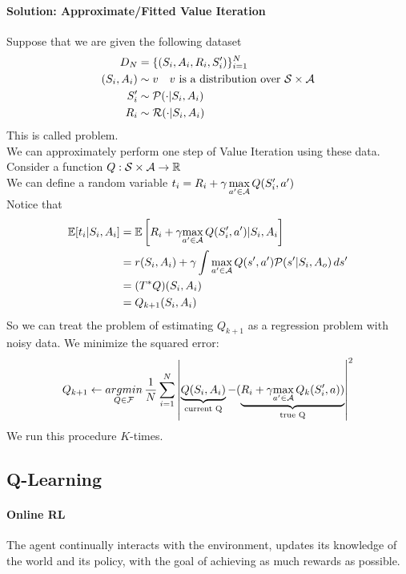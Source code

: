 \documentclass[11pt]{article}
\begin{document}
\paragraph{Solution: Approximate/Fitted Value Iteration}
Suppose that we are given the following dataset
\begin{align}
	D_N &= \{(S_i, A_i, R_i, S'_i)\}_{i=1}^N \\
	(S_i, A_i) &\sim v \quad \text{$v$ is a distribution over $\mathcal{S} \times \mathcal{A}$} \\
	S'_i &\sim \mathcal{P}(\cdot|S_i, A_i) \\
	R_i &\sim \mathcal{R}(\cdot|S_i, A_i)
\end{align}
This is called  problem. \\
We can approximately perform one step of Value Iteration using these data. \\
Consider a function $Q: \mathcal{S} \times \mathcal{A} \rightarrow \mathbb{R}$ \\
We can define a random variable $t_i = R_i + \gamma\,\underset{a' \in \mathcal{A}}{\max}\, Q(S'_i, a')$ \\
Notice that 
\begin{align}
	\mathbb{E}[t_i|S_i, A_i] &= \mathbb{E}\left[ R_i + \gamma \underset{a' \in \mathcal{A}}{\max} \, Q(S'_i, a')|S_i, A_i \right] \\
	&= r(S_i, A_i) + \gamma \int \underset{a' \in \mathcal{A}}{\max}\, Q(s', a')\mathcal{P}(s'|S_i,A_o)\, ds' \\
	&= (T^*Q)(S_i, A_i) \\
	&= Q_{k+1}(S_i, A_i)
\end{align}
So we can treat the problem of estimating $Q_{k+1}$ as a regression problem with noisy data. We minimize the squared error:
$$Q_{k+1} \leftarrow \underset{Q \in \mathcal{F}}{argmin} \, \frac{1}{N} \sum_{i=1}^N \left | \underbrace{Q(S_i, A_i)}_{\text{current Q}} - (\underbrace{R_i + \gamma \underset{a' \in \mathcal{A}}{\max} \, Q_k(S'_i, a))}_{\text{true Q}}\right |^2$$
We run this procedure $K$-times. \\

\subsection{Q-Learning}
\paragraph{Online RL}
The agent continually interacts with the environment, updates its knowledge of the world and its policy, with the goal of achieving as much rewards as possible.\\
\end{document}
